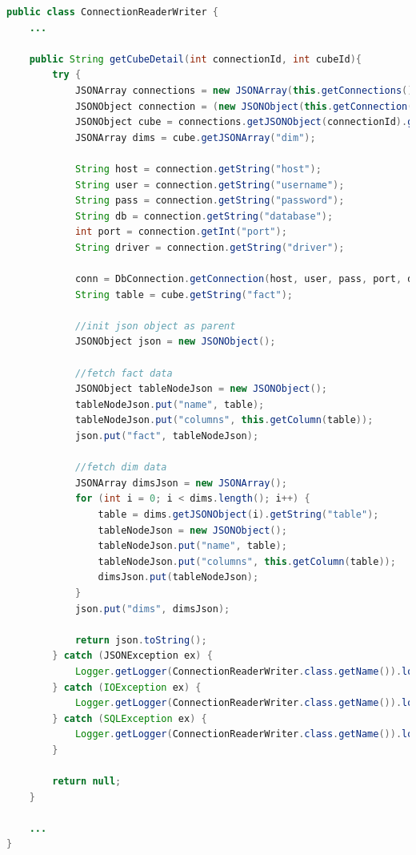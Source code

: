 \begin{lstlisting}[language=Java,basicstyle=\tiny,caption=ConnectionReaderWriter.java,label={lst:kode_bi_server_reporting_2}]
public class ConnectionReaderWriter {
	... 
	
	public String getCubeDetail(int connectionId, int cubeId){
        try {
            JSONArray connections = new JSONArray(this.getConnections());
            JSONObject connection = (new JSONObject(this.getConnection(connectionId))).getJSONObject("connection");
            JSONObject cube = connections.getJSONObject(connectionId).getJSONArray("cubes").getJSONObject(cubeId);
            JSONArray dims = cube.getJSONArray("dim");
            
            String host = connection.getString("host");
            String user = connection.getString("username");
            String pass = connection.getString("password");
            String db = connection.getString("database");
            int port = connection.getInt("port");
            String driver = connection.getString("driver");
            
            conn = DbConnection.getConnection(host, user, pass, port, db, driver);
            String table = cube.getString("fact");
            
            //init json object as parent
            JSONObject json = new JSONObject();
            
            //fetch fact data
            JSONObject tableNodeJson = new JSONObject();
            tableNodeJson.put("name", table);
            tableNodeJson.put("columns", this.getColumn(table));            
            json.put("fact", tableNodeJson);
            
            //fetch dim data
            JSONArray dimsJson = new JSONArray();
            for (int i = 0; i < dims.length(); i++) {
                table = dims.getJSONObject(i).getString("table");
                tableNodeJson = new JSONObject();
                tableNodeJson.put("name", table);
                tableNodeJson.put("columns", this.getColumn(table)); 
                dimsJson.put(tableNodeJson);
            }
            json.put("dims", dimsJson);
            
            return json.toString();
        } catch (JSONException ex) {
            Logger.getLogger(ConnectionReaderWriter.class.getName()).log(Level.SEVERE, null, ex);
        } catch (IOException ex) {
            Logger.getLogger(ConnectionReaderWriter.class.getName()).log(Level.SEVERE, null, ex);
        } catch (SQLException ex) {
            Logger.getLogger(ConnectionReaderWriter.class.getName()).log(Level.SEVERE, null, ex);
        } 
        
        return null;
    }
    
    ...
}
\end{lstlisting}

